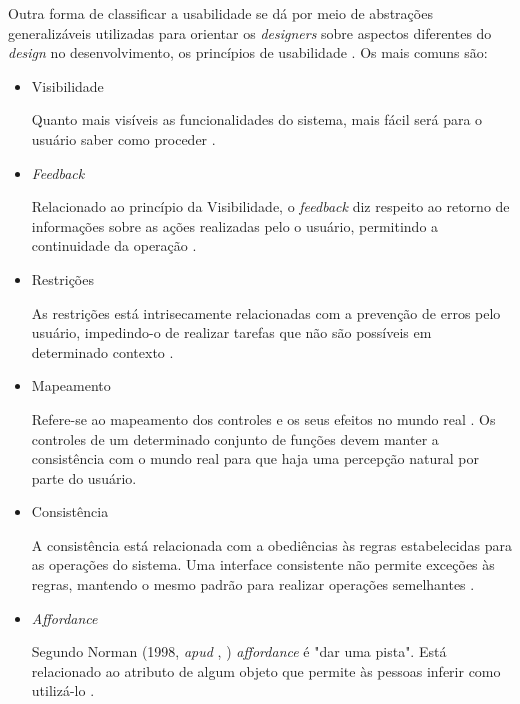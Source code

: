     Outra forma de classificar a usabilidade se dá por meio de abstrações generalizáveis utilizadas para orientar os \textit{designers}
    sobre aspectos diferentes do \textit{design} no desenvolvimento, os princípios de usabilidade \cite{preece}. Os mais comuns são:
    
    \begin{itemize}
     \item Visibilidade
	
	\subitem Quanto mais visíveis as funcionalidades do sistema, mais fácil será para o usuário saber como proceder \cite{preece}.
      
     \item \textit{Feedback}
	
	\subitem Relacionado ao princípio da Visibilidade, o \textit{feedback} diz respeito ao retorno de informações sobre as
	  ações realizadas pelo o usuário, permitindo a continuidade da operação \cite{preece}.
     
     \item Restrições
     
	\subitem As restrições está intrisecamente relacionadas com a prevenção de erros pelo usuário, impedindo-o de realizar 
	  tarefas que não são possíveis em determinado contexto \cite{preece}.

     \item Mapeamento
	
	\subitem Refere-se ao mapeamento dos controles e os seus efeitos no mundo real \cite{preece}.
	  Os controles de um determinado conjunto de funções devem manter a consistência com o mundo real para que haja uma
	  percepção natural por parte do usuário.
	
     \item Consistência
	
	\subitem A consistência está relacionada com a obediências às regras estabelecidas para as operações do sistema. 
	  Uma interface consistente não permite exceções às regras, mantendo o mesmo padrão para realizar operações
	  semelhantes \cite{preece}.
	
     \item \textit{Affordance}
	
	\subitem Segundo Norman (1998, \textit{apud} \citeauthor{preece}, \citeyear{preece}) \textit{affordance} é "dar uma pista".
	  Está relacionado ao atributo de algum objeto que permite às pessoas inferir como utilizá-lo \cite{preece}.
	  
    \end{itemize}
   
